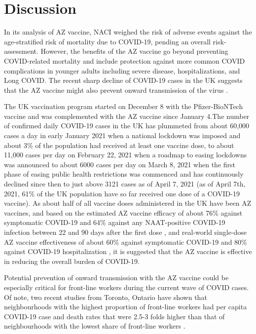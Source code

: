 \documentclass[]{interact}
\theoremstyle{plain}%
\theoremstyle{definition}
\theoremstyle{remark}
\begin{document}
\hypertarget{discussion}{%
\section{Discussion}\label{discussion}}

In its analysis of AZ vaccine, NACI weighed the risk of adverse events
against the age-stratified risk of mortality due to COVID-19, pending an
overall risk-assessment. However, the benefits of the AZ vaccine go
beyond preventing COVID-related mortality and include protection against
more common COVID complications in younger adults including severe
disease, hospitalizations, and Long COVID. The recent sharp decline of
COVID-19 cases in the UK suggests that the AZ vaccine might also prevent
onward transmission of the virus
\citep{our_world_in_data_covid-19_2021}.

The UK vaccination program started on December 8 with the
Pfizer-BioNTech vaccine and was complemented with the AZ vaccine since
January 4.The number of confirmed daily COVID-19 cases in the UK has
plummeted from about 60,000 cases a day in early January 2021 when a
national lockdown was imposed and about 3\% of the population had
received at least one vaccine dose, to about 11,000 cases per day on
February 22, 2021 when a roadmap to easing lockdowns was announced to
about 6000 cases per day on March 8, 2021 when the first phase of easing
public health restrictions was commenced \citep{bbc_lockdown_2021} and
has continuously declined since then to just above 3121 cases as of
April 7, 2021 (as of April 7th, 2021, 61\% of the UK population have so
far received one dose of a COVID-19 vaccine). As about half of all
vaccine doses administered in the UK have been AZ vaccines, and based on
the estimated AZ vaccine efficacy of about 76\% against symptomatic
COVID-19 and 64\% against any NAAT-positive COVID-19 infection between
22 and 90 days after the first dose \citep{voysey_single-dose_2021}, and
real-world single-dose AZ vaccine effectiveness of about 60\% against
symptomatic COVID-19 and 80\% against COVID-19 hospitalization
\citep{public_health_england_1public_2021}, it is suggested that the AZ
vaccine is effective in reducing the overall burden of COVID-19.

Potential prevention of onward transmission with the AZ vaccine could be
especially critical for front-line workers during the current wave of
COVID cases. Of note, two recent studies from Toronto, Ontario have
shown that neighbourhoods with the highest proportion of front-line
workers had per capita COVID-19 case and death rates that were 2.5-3
folds higher than that of neighbourhoods with the lowest share of
front-line workers
\citep[\citet{rao_disproportionate_2021}]{chagla_characterizing_2021}.
\end{document}

